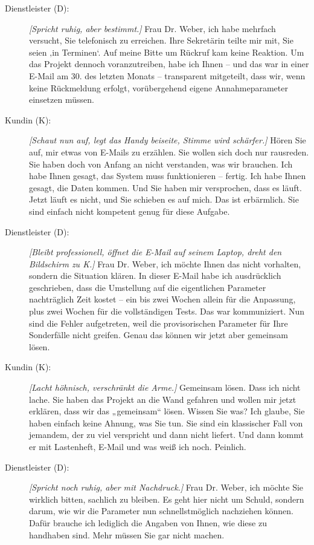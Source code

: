 \begin{description}
    \item[Dienstleister (D):] \textit{[Spricht ruhig, aber bestimmt.]} Frau Dr. Weber, ich habe mehrfach versucht, Sie telefonisch zu erreichen. Ihre Sekretärin teilte mir mit, Sie seien ‚in Terminen‘. Auf meine Bitte um Rückruf kam keine Reaktion. Um das Projekt dennoch voranzutreiben, habe ich Ihnen – und das war in einer E-Mail am 30. des letzten Monats – transparent mitgeteilt, dass wir, wenn keine Rückmeldung erfolgt, vorübergehend eigene Annahmeparameter einsetzen müssen.
    
    \item[Kundin (K):] \textit{[Schaut nun auf, legt das Handy beiseite, Stimme wird schärfer.]} Hören Sie auf, mir etwas von E-Mails zu erzählen. Sie wollen sich doch nur rausreden. Sie haben doch von Anfang an nicht verstanden, was wir brauchen. Ich habe Ihnen gesagt, das System muss funktionieren – fertig. Ich habe Ihnen gesagt, die Daten kommen. Und Sie haben mir versprochen, dass es läuft. Jetzt läuft es nicht, und Sie schieben es auf mich. Das ist erbärmlich. Sie sind einfach nicht kompetent genug für diese Aufgabe.
    
    \item[Dienstleister (D):] \textit{[Bleibt professionell, öffnet die E-Mail auf seinem Laptop, dreht den Bildschirm zu K.]} Frau Dr. Weber, ich möchte Ihnen das nicht vorhalten, sondern die Situation klären. In dieser E-Mail habe ich ausdrücklich geschrieben, dass die Umstellung auf die eigentlichen Parameter nachträglich Zeit kostet – ein bis zwei Wochen allein für die Anpassung, plus zwei Wochen für die vollständigen Tests. Das war kommuniziert. Nun sind die Fehler aufgetreten, weil die provisorischen Parameter für Ihre Sonderfälle nicht greifen. Genau das können wir jetzt aber gemeinsam lösen.
    
    \item[Kundin (K):] \textit{[Lacht höhnisch, verschränkt die Arme.]} Gemeinsam lösen. Dass ich nicht lache. Sie haben das Projekt an die Wand gefahren und wollen mir jetzt erklären, dass wir das „gemeinsam“ lösen. Wissen Sie was? Ich glaube, Sie haben einfach keine Ahnung, was Sie tun. Sie sind ein klassischer Fall von jemandem, der zu viel verspricht und dann nicht liefert. Und dann kommt er mit Lastenheft, E-Mail und was weiß ich noch. Peinlich.
    
    \item[Dienstleister (D):] \textit{[Spricht noch ruhig, aber mit Nachdruck.]} Frau Dr. Weber, ich möchte Sie wirklich bitten, sachlich zu bleiben. Es geht hier nicht um Schuld, sondern darum, wie wir die Parameter nun schnellstmöglich nachziehen können. Dafür brauche ich lediglich die Angaben von Ihnen, wie diese zu handhaben sind. Mehr müssen Sie gar nicht machen.
    

\end{description}
